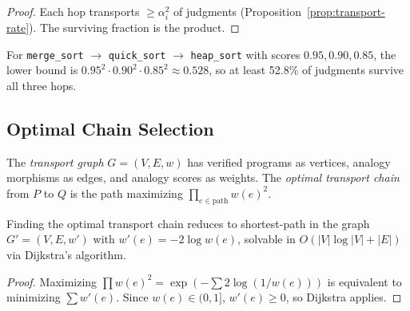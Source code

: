 \documentclass[11pt]{article}
\newcommand{\AnalogyScore}{\alpha}
\begin{document}
\begin{proof}
Each hop transports $\geq \AnalogyScore_i^2$ of judgments
(Proposition~\ref{prop:transport-rate}).  The surviving fraction
is the product.
\end{proof}

\begin{example}\label{ex:three-hop}
For \texttt{merge\_sort} $\to$ \texttt{quick\_sort} $\to$
\texttt{heap\_sort} with scores $0.95, 0.90, 0.85$, the lower bound
is $0.95^2 \cdot 0.90^2 \cdot 0.85^2 \approx 0.528$, so at least
52.8\% of judgments survive all three hops.
\end{example}

\subsection{Optimal Chain Selection}

\begin{definition}\label{def:transport-graph}
The \emph{transport graph} $G = (V, E, w)$ has verified programs as
vertices, analogy morphisms as edges, and analogy scores as weights.
The \emph{optimal transport chain} from $P$ to $Q$ is the path
maximizing $\prod_{e \in \text{path}} w(e)^2$.
\end{definition}

\begin{proposition}\label{prop:log-path}
Finding the optimal transport chain reduces to shortest-path in the
graph $G' = (V, E, w')$ with $w'(e) = -2 \log w(e)$, solvable in
$O(|V| \log |V| + |E|)$ via Dijkstra's algorithm.
\end{proposition}

\begin{proof}
Maximizing $\prod w(e)^2 = \exp(-\sum 2 \log(1/w(e)))$ is equivalent
to minimizing $\sum w'(e)$.  Since $w(e) \in (0, 1]$,
$w'(e) \geq 0$, so Dijkstra applies.
\end{proof}
\end{document}
